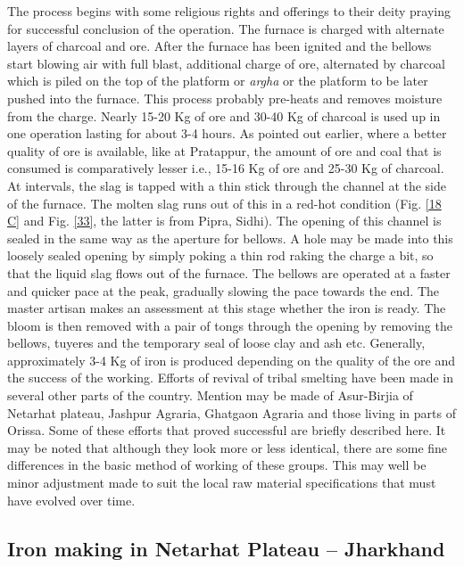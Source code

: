 The process begins with some religious rights and offerings to their deity praying for successful conclusion of the operation. The furnace is charged with alternate layers of charcoal and ore. After the furnace has been ignited and the bellows start blowing air with full blast, additional charge of ore, alternated by charcoal which is piled on the top of the platform or {\it argha} or the platform to be later pushed into the furnace. This process probably pre-heats and removes moisture from the charge. Nearly 15-20 Kg of ore and 30-40 Kg of charcoal is used up in one operation lasting for about 3-4 hours. As pointed out earlier, where a better quality of ore is available, like at Pratappur, the amount of ore and coal that is consumed is comparatively lesser i.e., 15-16 Kg of ore and 25-30 Kg of charcoal. At intervals, the slag is tapped with a thin stick through the channel at the side of the furnace. The molten slag runs out of this in a red-hot condition (Fig. \ref{18 C} and Fig. \ref{33}, the latter is from Pipra, Sidhi). The opening of this channel is sealed in the same way as the aperture for bellows. A hole may be made into this loosely sealed opening by simply poking a thin rod raking the charge a bit, so that the liquid slag flows out of the furnace. The bellows are operated at a faster and quicker pace at the peak, gradually slowing the pace towards the end. The master artisan makes an assessment at this stage whether the iron is ready. The bloom is then removed with a pair of tongs through the opening by removing the bellows, tuyeres and the temporary seal of loose clay and ash etc. Generally, approximately 3-4 Kg of iron is produced depending on the quality of the ore and the success of the working. Efforts of revival of tribal smelting have been made in several other parts of the country. Mention may be made of Asur-Birjia of Netarhat plateau, Jashpur Agraria, Ghatgaon Agraria and those living in parts of Orissa. Some of these efforts that proved successful are briefly described here. It may be noted that although they look more or less identical, there are some fine differences in the basic method of working of these groups. This may well be minor adjustment made to suit the local raw material specifications that must have evolved over time.

\vspace{-.3cm}

\subsection*{Iron making in Netarhat Plateau – Jharkhand}\label{chapter7-subsection-7.1b}

